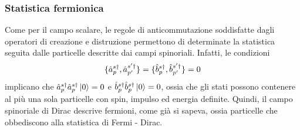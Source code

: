 \subsubsection{Statistica fermionica}
Come per il campo scalare, le regole di anticommutazione soddisfatte dagli operatori di creazione e distruzione permettono di determinate la statistica seguita dalle particelle descritte dai campi spinoriali. Infatti, le condizioni 
\begin{equation}
    \{\hat{a}^{s\dagger}_p,\hat{a}^{s'\dagger}_{p'}\} = \{\hat{b}^{s\dagger}_p,\hat{b}^{s'\dagger}_{p'}\} = 0
\end{equation}
implicano che $\hat{a}^{s\dagger}_p\hat{a}^{s\dagger}_p\ket{0} = 0$ e $\hat{b}^{s\dagger}_p\hat{b}^{s\dagger}_p\ket{0} = 0$, ossia che gli stati possono contenere al più una sola particelle con spin, impulso ed energia definite. Quindi, il campo spinoriale di Dirac descrive fermioni, come già si sapeva, ossia particelle che obbediscono alla statistica di Fermi - Dirac.









